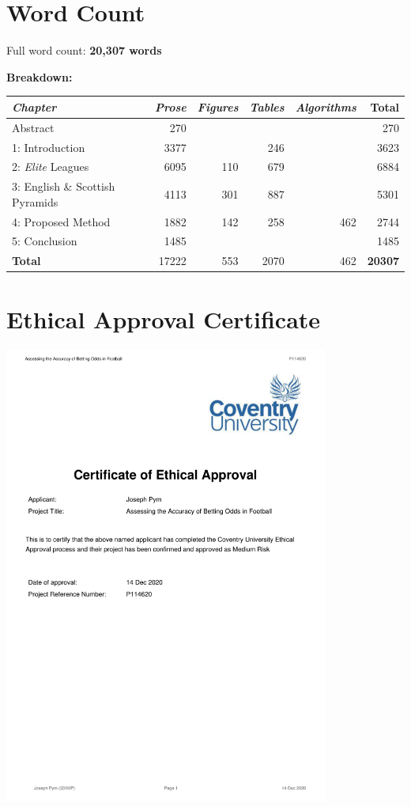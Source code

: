 \documentclass[a4paper,10pt]{report}
\begin{document}
\chapter{Word Count} \label{app:wordcount}
Full word count: \textbf{20,307 words}\vspace{3mm}

\noindent\textbf{Breakdown:}\vspace{1mm}

\noindent\begin{tabular}{l|rrrr|r}
\textit{Chapter}	&\textit{Prose}	&\textit{Figures}&\textit{Tables}& \textit{Algorithms}	&\textbf{Total} \\
\hline
Abstract					& 270	& 		& 		&		& 270 \\
1: Introduction				& 3377	& 		& 246	&		& 3623 \\
2: \textit{Elite} Leagues	& 6095	& 110	& 679	&		& 6884 \\
3: English \& Scottish Pyramids& 4113	& 301	& 887	&		& 5301 \\
4: Proposed Method			& 1882	& 142	& 258	& 462	& 2744 \\
5: Conclusion				& 1485	& 		& 		&		& 1485 \\ \hline
\textbf{Total}				& 17222	& 553	& 2070	& 462	& \textbf{20307} 
\end{tabular}


\chapter{Ethical Approval Certificate} \label{app:ethics}

\noindent\begin{center}\includegraphics[width=0.8\textwidth, trim={0 7cm 0 0},clip]{Certificate-114620.pdf}\end{center}
\end{document}
